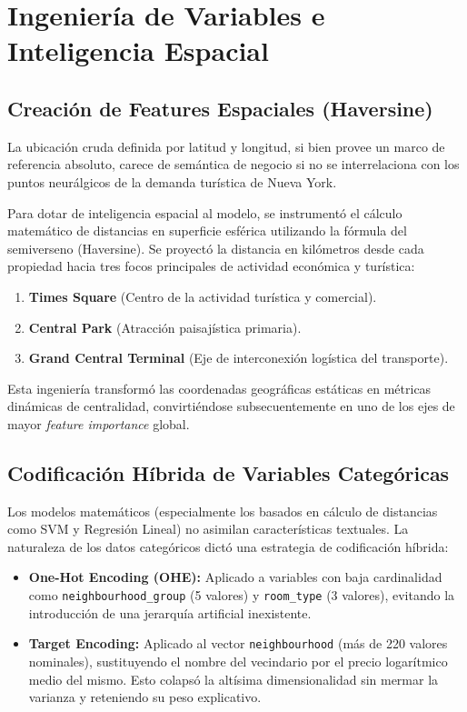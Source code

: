 \chapter{Ingeniería de Variables e Inteligencia Espacial}

\section{Creación de Features Espaciales (Haversine)}
La ubicación cruda definida por latitud y longitud, si bien provee un marco de referencia absoluto, carece de semántica de negocio si no se interrelaciona con los puntos neurálgicos de la demanda turística de Nueva York. 

Para dotar de inteligencia espacial al modelo, se instrumentó el cálculo matemático de distancias en superficie esférica utilizando la fórmula del semiverseno (Haversine). Se proyectó la distancia en kilómetros desde cada propiedad hacia tres focos principales de actividad económica y turística:
\begin{enumerate}
    \item \textbf{Times Square} (Centro de la actividad turística y comercial).
    \item \textbf{Central Park} (Atracción paisajística primaria).
    \item \textbf{Grand Central Terminal} (Eje de interconexión logística del transporte).
\end{enumerate}

Esta ingeniería transformó las coordenadas geográficas estáticas en métricas dinámicas de centralidad, convirtiéndose subsecuentemente en uno de los ejes de mayor \textit{feature importance} global.

\section{Codificación Híbrida de Variables Categóricas}
Los modelos matemáticos (especialmente los basados en cálculo de distancias como SVM y Regresión Lineal) no asimilan características textuales. La naturaleza de los datos categóricos dictó una estrategia de codificación híbrida:
\begin{itemize}
    \item \textbf{One-Hot Encoding (OHE):} Aplicado a variables con baja cardinalidad como \texttt{neighbourhood\_group} (5 valores) y \texttt{room\_type} (3 valores), evitando la introducción de una jerarquía artificial inexistente.
    \item \textbf{Target Encoding:} Aplicado al vector \texttt{neighbourhood} (más de 220 valores nominales), sustituyendo el nombre del vecindario por el precio logarítmico medio del mismo. Esto colapsó la altísima dimensionalidad sin mermar la varianza y reteniendo su peso explicativo.
\end{itemize}


